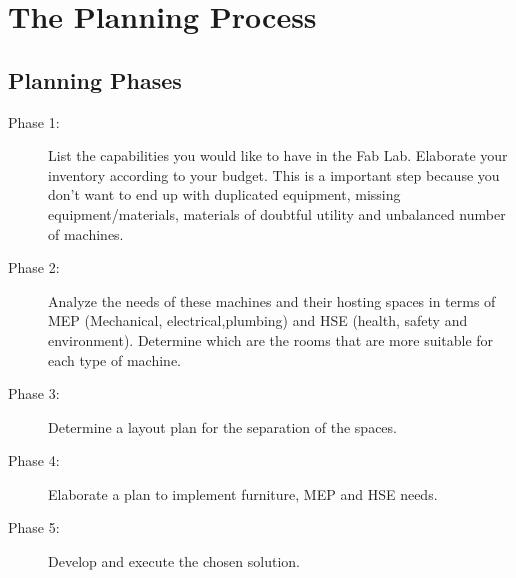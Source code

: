 \documentclass[a4paper,12pt,titlepage]{article}
\begin{document}
\section{The Planning Process}
\subsection{Planning Phases}
\begin{description}
\item [Phase 1:] List the capabilities you would like to have in the Fab Lab. Elaborate your inventory according to your budget. This is a important step because you don't want to end up with duplicated equipment, missing equipment/materials, materials of doubtful utility and unbalanced number of machines.

\item [Phase 2:] Analyze the needs of these machines and their hosting spaces in terms of MEP (Mechanical, electrical,plumbing) and HSE (health, safety and environment). Determine which are the rooms that are
more suitable for each type of machine.
\item [Phase 3:] Determine a layout plan for the separation of the spaces.
\item [Phase 4:] Elaborate a plan to implement furniture, MEP and HSE needs.
\item [Phase 5:] Develop and execute the chosen solution.

\end{description}
\end{document}
